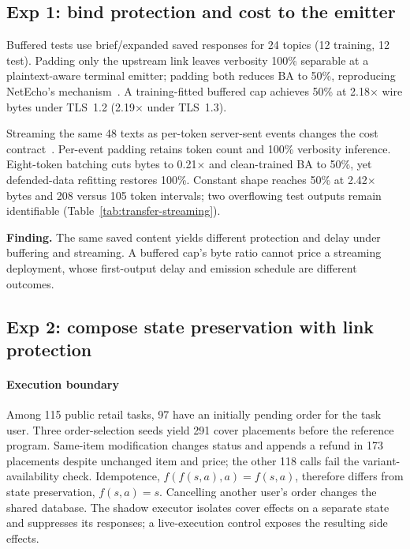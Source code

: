 \subsection{Exp 1: bind protection and cost to the emitter}\label{sec:exp-emitter}
Buffered tests use brief/expanded saved responses for 24 topics (12 training, 12 test). Padding only the upstream link leaves verbosity 100\% separable at a plaintext-aware terminal emitter; padding both reduces BA to 50\%, reproducing NetEcho's mechanism~\cite{netecho2025}. A training-fitted buffered cap achieves 50\% at 2.18$\times$ wire bytes under TLS~1.2 (2.19$\times$ under TLS~1.3).

Streaming the same 48 texts as per-token server-sent events changes the cost contract~\cite{weiss2024prompt,whisperleak2025}. Per-event padding retains token count and 100\% verbosity inference. Eight-token batching cuts bytes to 0.21$\times$ and clean-trained BA to 50\%, yet defended-data refitting restores 100\%. Constant shape reaches 50\% at 2.42$\times$ bytes and 208 versus 105 token intervals; two overflowing test outputs remain identifiable (Table~\ref{tab:transfer-streaming}).

\textbf{Finding.} The same saved content yields different protection and delay under buffering and streaming. A buffered cap's byte ratio cannot price a streaming deployment, whose first-output delay and emission schedule are different outcomes.

\subsection{Exp 2: compose state preservation with link protection}\label{sec:exp-state}
\paragraph{Execution boundary}
Among 115 public retail tasks, 97 have an initially pending order for the task user. Three order-selection seeds yield 291 cover placements before the reference program. Same-item modification changes status and appends a refund in 173 placements despite unchanged item and price; the other 118 calls fail the variant-availability check. Idempotence, $f(f(s,a),a)=f(s,a)$, therefore differs from state preservation, $f(s,a)=s$. Cancelling another user's order changes the shared database. The shadow executor isolates cover effects on a separate state and suppresses its responses; a live-execution control exposes the resulting side effects.

